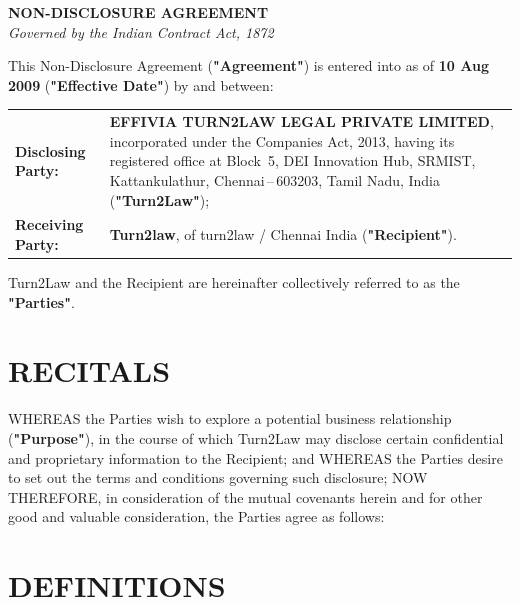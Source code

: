 \documentclass[10pt]{article}
\begin{document}
\thispagestyle{empty}

\begin{center}
  {\fontsize{15pt}{19pt}\selectfont\textbf{NON-DISCLOSURE AGREEMENT}}\\[4pt]
  {\fontsize{9pt}{12pt}\selectfont\textit{Governed by the Indian Contract Act, 1872}}
\end{center}

\vspace{10pt}
\noindent This Non-Disclosure Agreement (\textbf{"Agreement"}) is entered into as of \textbf{10 Aug 2009} (\textbf{"Effective Date"}) by and between:

\vspace{8pt}
\begin{tabularx}{\textwidth}{@{}lX@{}}
\textbf{Disclosing Party:} &
\textbf{EFFIVIA TURN2LAW LEGAL PRIVATE LIMITED}, incorporated under the Companies Act, 2013, having its registered office at Block~5, DEI Innovation Hub, SRMIST, Kattankulathur, Chennai\,--\,603203, Tamil Nadu, India (\textbf{"Turn2Law"});\\[6pt]
\textbf{Receiving Party:} &
\textbf{Turn2law}, of turn2law / Chennai India (\textbf{"Recipient"}).\\
\end{tabularx}

\vspace{6pt}
\noindent Turn2Law and the Recipient are hereinafter collectively referred to as the \textbf{"Parties"}.

\section*{RECITALS}

WHEREAS the Parties wish to explore a potential business relationship (\textbf{"Purpose"}), in the course of which Turn2Law may disclose certain confidential and proprietary information to the Recipient; and WHEREAS the Parties desire to set out the terms and conditions governing such disclosure; NOW THEREFORE, in consideration of the mutual covenants herein and for other good and valuable consideration, the Parties agree as follows:

\section{DEFINITIONS}
\end{document}
